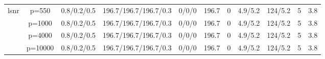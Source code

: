 \begin{table}[ht]
{\begin{tabular}{|c|c|ccccccccc|}
  \midrule\multirow{4}[2]{*}{lsnr} & p=550 & 0.8/0.2/0.5 & 196.7/196.7/196.7/0.3 & 0/0/0 & 196.7 & 0 & 4.9/5.2 & 124/5.2 & 5 & 3.8 \\ 
   & p=1000 & 0.8/0.2/0.5 & 196.7/196.7/196.7/0.3 & 0/0/0 & 196.7 & 0 & 4.9/5.2 & 124/5.2 & 5 & 3.8 \\ 
   & p=4000 & 0.8/0.2/0.5 & 196.7/196.7/196.7/0.3 & 0/0/0 & 196.7 & 0 & 4.9/5.2 & 124/5.2 & 5 & 3.8 \\ 
   & p=10000 & 0.8/0.2/0.5 & 196.7/196.7/196.7/0.3 & 0/0/0 & 196.7 & 0 & 4.9/5.2 & 124/5.2 & 5 & 3.8 \\ 
   \bottomrule 
\end{tabular}
}
\end{table}
